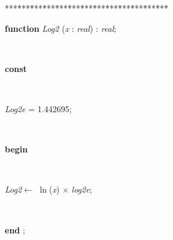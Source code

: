 \documentclass[10pt, a4paper]{article}
\begin{document}
\begin{tabbing}
***\=***\=***\=***\=***\=***\=***\=***\=***\=***\=***\=***\=***\=\kill
\parbox{14cm}{\textsf {\textbf {function } \textsf{\textit{Log2} (\textit{x} : \textit{real}) : \textit{real}}; }}\\
\+\parbox{14cm}{\textsf{\textbf{const} }}\\
\parbox{14cm}{\textsf{\textit{Log2e}  = 1.442695;}}\\
\-\<\+\parbox{14cm}{\textsf{\textbf{begin} }}\\
\parbox{14cm}{\textsf{\textit{Log2}$\leftarrow$ $\ln$(\textit{x}) $\times$ \textit{log2e}}; }\\
\<\-\parbox{14cm}{\textsf{\textbf{end} ;}}\\
\end{tabbing}
\end{document}
